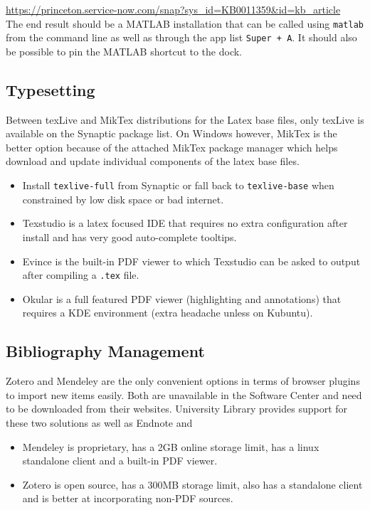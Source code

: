 \documentclass[8pt,letterpaper,twocolumn]{article}
\begin{document}
\url{https://princeton.service-now.com/snap?sys_id=KB0011359&id=kb_article}\\

The end result should be a MATLAB installation that can be called using \texttt{matlab} from the command line as well as through the app list \texttt{Super + A}. It should also be possible to pin the MATLAB shortcut to the dock.

\subsection{Typesetting}

Between texLive and MikTex distributions for the Latex base files, only texLive is available on the Synaptic package list. On Windows however, MikTex is the better option because of the attached MikTex package manager which helps download and update individual components of the latex base files.

\begin{itemize}
	\item Install \texttt{texlive-full} from Synaptic or fall back to \texttt{texlive-base} when constrained by low disk space or bad internet.
	\item Texstudio is a latex focused IDE that requires no extra configuration after install and has very good auto-complete tooltips.
	\item Evince is the built-in PDF viewer to which Texstudio can be asked to output after compiling a \texttt{.tex} file. 
	\item Okular is a full featured PDF viewer (highlighting and annotations) that requires a KDE environment (extra headache unless on Kubuntu).
\end{itemize} 


\subsection{Bibliography Management}

Zotero and Mendeley are the only convenient options in terms of browser plugins to import new items easily. Both are unavailable in the Software Center and need to be downloaded from their websites. University Library provides support for these two solutions as well as Endnote and 

\begin{itemize}
	\item Mendeley is proprietary, has a 2GB online storage limit, has a linux standalone client and a built-in PDF viewer.
	\item Zotero is open source, has a 300MB storage limit, also has a standalone client and is better at incorporating non-PDF sources.
\end{itemize}
\end{document}
